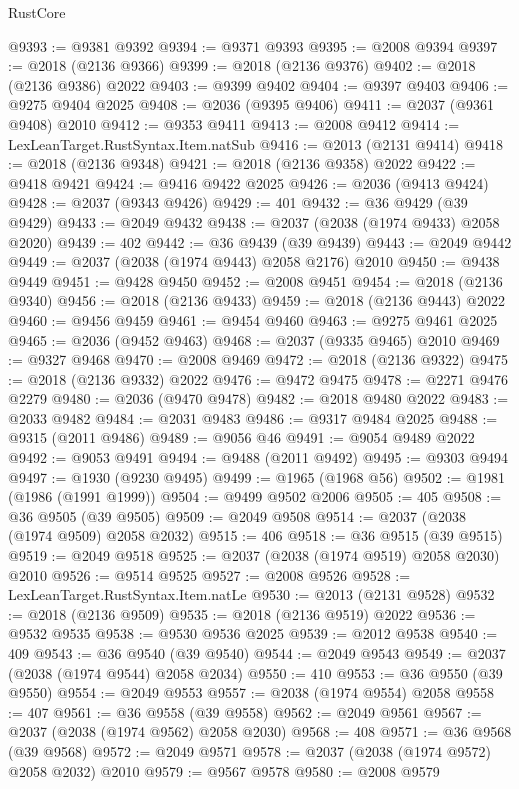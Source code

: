 \begin{lexlean}{RustCore}
\begin{coremodule}
@9393 := @9381 @9392
@9394 := @9371 @9393
@9395 := @2008 @9394
@9397 := @2018 (@2136 @9366)
@9399 := @2018 (@2136 @9376)
@9402 := @2018 (@2136 @9386) @2022
@9403 := @9399 @9402
@9404 := @9397 @9403
@9406 := @9275 @9404 @2025
@9408 := @2036 (@9395 @9406)
@9411 := @2037 (@9361 @9408) @2010
@9412 := @9353 @9411
@9413 := @2008 @9412
@9414 := LexLeanTarget.RustSyntax.Item.natSub
@9416 := @2013 (@2131 @9414)
@9418 := @2018 (@2136 @9348)
@9421 := @2018 (@2136 @9358) @2022
@9422 := @9418 @9421
@9424 := @9416 @9422 @2025
@9426 := @2036 (@9413 @9424)
@9428 := @2037 (@9343 @9426)
@9429 := 401
@9432 := @36 @9429 (@39 @9429)
@9433 := @2049 @9432
@9438 := @2037 (@2038 (@1974 @9433) @2058 @2020)
@9439 := 402
@9442 := @36 @9439 (@39 @9439)
@9443 := @2049 @9442
@9449 := @2037 (@2038 (@1974 @9443) @2058 @2176) @2010
@9450 := @9438 @9449
@9451 := @9428 @9450
@9452 := @2008 @9451
@9454 := @2018 (@2136 @9340)
@9456 := @2018 (@2136 @9433)
@9459 := @2018 (@2136 @9443) @2022
@9460 := @9456 @9459
@9461 := @9454 @9460
@9463 := @9275 @9461 @2025
@9465 := @2036 (@9452 @9463)
@9468 := @2037 (@9335 @9465) @2010
@9469 := @9327 @9468
@9470 := @2008 @9469
@9472 := @2018 (@2136 @9322)
@9475 := @2018 (@2136 @9332) @2022
@9476 := @9472 @9475
@9478 := @2271 @9476 @2279
@9480 := @2036 (@9470 @9478)
@9482 := @2018 @9480 @2022
@9483 := @2033 @9482
@9484 := @2031 @9483
@9486 := @9317 @9484 @2025
@9488 := @9315 (@2011 @9486)
@9489 := @9056 @46
@9491 := @9054 @9489 @2022
@9492 := @9053 @9491
@9494 := @9488 (@2011 @9492)
@9495 := @9303 @9494
@9497 := @1930 (@9230 @9495)
@9499 := @1965 (@1968 @56)
@9502 := @1981 (@1986 (@1991 @1999))
@9504 := @9499 @9502 @2006
@9505 := 405
@9508 := @36 @9505 (@39 @9505)
@9509 := @2049 @9508
@9514 := @2037 (@2038 (@1974 @9509) @2058 @2032)
@9515 := 406
@9518 := @36 @9515 (@39 @9515)
@9519 := @2049 @9518
@9525 := @2037 (@2038 (@1974 @9519) @2058 @2030) @2010
@9526 := @9514 @9525
@9527 := @2008 @9526
@9528 := LexLeanTarget.RustSyntax.Item.natLe
@9530 := @2013 (@2131 @9528)
@9532 := @2018 (@2136 @9509)
@9535 := @2018 (@2136 @9519) @2022
@9536 := @9532 @9535
@9538 := @9530 @9536 @2025
@9539 := @2012 @9538
@9540 := 409
@9543 := @36 @9540 (@39 @9540)
@9544 := @2049 @9543
@9549 := @2037 (@2038 (@1974 @9544) @2058 @2034)
@9550 := 410
@9553 := @36 @9550 (@39 @9550)
@9554 := @2049 @9553
@9557 := @2038 (@1974 @9554) @2058
@9558 := 407
@9561 := @36 @9558 (@39 @9558)
@9562 := @2049 @9561
@9567 := @2037 (@2038 (@1974 @9562) @2058 @2030)
@9568 := 408
@9571 := @36 @9568 (@39 @9568)
@9572 := @2049 @9571
@9578 := @2037 (@2038 (@1974 @9572) @2058 @2032) @2010
@9579 := @9567 @9578
@9580 := @2008 @9579

\end{coremodule}
\end{lexlean}
